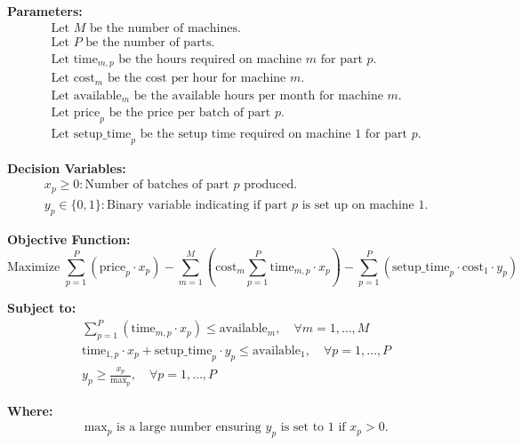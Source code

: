 \documentclass{article}
\begin{document}
\textbf{Parameters:}
\begin{align*}
& \text{Let } M \text{ be the number of machines.} \\
& \text{Let } P \text{ be the number of parts.} \\
& \text{Let } \text{time}_{m,p} \text{ be the hours required on machine } m \text{ for part } p. \\
& \text{Let } \text{cost}_m \text{ be the cost per hour for machine } m. \\
& \text{Let } \text{available}_m \text{ be the available hours per month for machine } m. \\
& \text{Let } \text{price}_p \text{ be the price per batch of part } p. \\
& \text{Let } \text{setup\_time}_p \text{ be the setup time required on machine 1 for part } p.
\end{align*}

\textbf{Decision Variables:}
\begin{align*}
& x_p \geq 0: \text{Number of batches of part } p \text{ produced.} \\
& y_p \in \{0, 1\}: \text{Binary variable indicating if part } p \text{ is set up on machine 1.}
\end{align*}

\textbf{Objective Function:}
\begin{equation}
\text{Maximize } \sum_{p=1}^{P} \left(\text{price}_p \cdot x_p \right) - \sum_{m=1}^{M} \left( \text{cost}_m \sum_{p=1}^{P} \text{time}_{m,p} \cdot x_p \right) - \sum_{p=1}^{P} \left( \text{setup\_time}_p \cdot \text{cost}_1 \cdot y_p \right)
\end{equation}

\textbf{Subject to:}
\begin{align}
& \sum_{p=1}^{P} \left(\text{time}_{m,p} \cdot x_p \right) \leq \text{available}_m, \quad \forall m = 1, \ldots, M \\
& \text{time}_{1,p} \cdot x_p + \text{setup\_time}_p \cdot y_p \leq \text{available}_1, \quad \forall p = 1, \ldots, P \\
& y_p \geq \frac{x_p}{\text{max}_p}, \quad \forall p = 1, \ldots, P
\end{align}

\textbf{Where:}
\begin{align*}
& \text{max}_p \text{ is a large number ensuring } y_p \text{ is set to 1 if } x_p > 0.
\end{align*}
\end{document}
